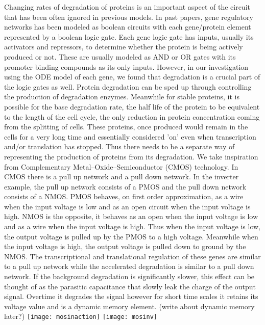 \documentclass{article}
\begin{document}
Changing rates of degradation of proteins is an important aspect of the circuit that has been often ignored in previous models.  In past papers, gene regulatory networks has been modeled as boolean circuits with each gene/protein element represented by a boolean logic gate.  Each gene logic gate has inputs, usually its activators and repressors, to determine whether the protein is being actively produced or not.  These are usually modeled as AND or OR gates with its promoter binding compounds as its only inputs.  However, in our investigation using the ODE model of each gene, we found that degradation is a crucial part of the logic gates as well.  Protein degradation can be sped up through controlling the production of degradation enzymes.  Meanwhile for stable proteins, it is possible for the base degradation rate, the half life of the protein to be equivalent to the length of the cell cycle, the only reduction in protein concentration coming from the splitting of cells.  These proteins, once produced would remain in the cells for a very long time and essentially considered 'on' even when transcription and/or translation has stopped.  Thus there needs to be a separate way of representing the production of proteins from its degradation.  We take inspiration from Complementary Metal–Oxide–Semiconductor (CMOS) technology.  In CMOS there is a pull up network and a pull down network.  In the inverter example, the pull up network consists of a PMOS and the pull down network consists of a NMOS.  PMOS behaves, on first order approximation, as a wire when the input voltage is low and as an open circuit when the input voltage is high.  NMOS is the opposite, it behaves as an open when the input voltage is low and as a wire when the input voltage is high.  Thus when the input voltage is low, the output voltage is pulled up by the PMOS to a high voltage.  Meanwhile when the input voltage is high, the output voltage is pulled down to ground by the NMOS.  The transcriptional and translational regulation of these genes are similar to a pull up network while the accelerated degradation is similar to a pull down network.  If the background degradation is significantly slower, this effect can be thought of as the parasitic capacitance that slowly leak the charge of the output signal.  Overtime it degrades the signal however for short time scales it retains its voltage value and is a dynamic memory element.
(write about dynamic memory later?)
\newline
\texttt{[image: mosinaction]}
\texttt{[image: mosinv]}
\newline \newline
\end{document}
